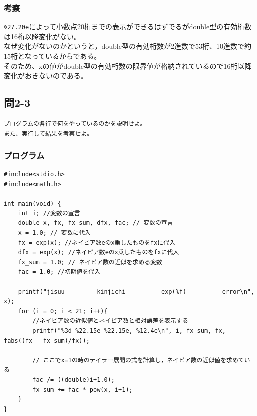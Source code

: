 \documentclass{jarticle}
\begin{document}
\subsubsection{考察\\}
\verb|%27.20e|によって小数点20桁までの表示ができるはずでるがdouble型の有効桁数は16桁以降変化がない。\\
なぜ変化がないのかというと，double型の有効桁数が2進数で53桁、10進数で約15桁となっているからである。\\
そのため、xの値がdouble型の有効桁数の限界値が格納されているので16桁以降変化がおきないのである。\\


\subsection{問2-3\\}
\begin{verbatim}
プログラムの各行で何をやっているのかを説明せよ。
また、実行して結果を考察せよ。
\end{verbatim}
\subsubsection{プログラム\\}
\begin{breakbox}
\begin{verbatim}
#include<stdio.h>
#include<math.h>

int main(void) { 
    int i; //変数の宣言
    double x, fx, fx_sum, dfx, fac; // 変数の宣言
    x = 1.0; // 変数に代入
    fx = exp(x); //ネイピア数eのx乗したものをfxに代入
    dfx = exp(x); //ネイピア数eのx乗したものをfxに代入
    fx_sum = 1.0; // ネイピア数の近似を求める変数
    fac = 1.0; //初期値を代入

    printf("jisuu         kinjichi          exp(%f)          error\n", x);
    for (i = 0; i < 21; i++){
    	//ネイピア数の近似値とネイピア数と相対誤差を表示する
        printf("%3d %22.15e %22.15e, %12.4e\n", i, fx_sum, fx, fabs((fx - fx_sum)/fx));
        
        // ここでx=1の時のテイラー展開の式を計算し，ネイピア数の近似値を求めている
        fac /= ((double)i+1.0);
        fx_sum += fac * pow(x, i+1);
    }
}
\end{verbatim}
\end{breakbox}
\end{document}
